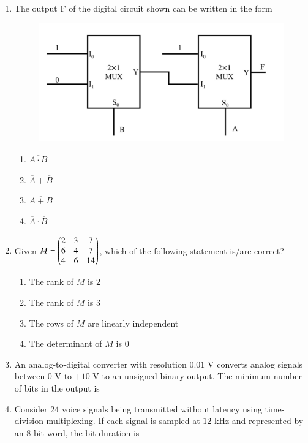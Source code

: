 \documentclass[journal,12pt,onecolumn]{IEEEtran}
\theoremstyle{remark}
\begin{document}
\begin{enumerate}
\item The output F of the digital circuit shown can be written in the form \underline{\hspace{2cm}}

\hfill{}
\begin{figure}[H]
\includegraphics[width = 0.7\columnwidth]{q23}
\caption*{}
\label{q23}
\end{figure}
\begin{enumerate}
\item $\overline{\overline{A \cdot B}}$
\item $\overline{A} + \overline{B}$
\item $\overline{A+B}$
\item $\overline{A} \cdot \overline{B}$
\end{enumerate}

\item Given $M = \begin{pmatrix} 2 & 3 & 7 \\ 6 & 4 & 7 \\ 4 & 6 & 14 \end{pmatrix}$, which of the following statement is/are correct?

\hfill{}
\begin{enumerate}
\item The rank of $M$ is $2$
\item The rank of $M$ is $3$
\item The rows of $M$ are linearly independent
\item The determinant of $M$ is $0$
\end{enumerate}

\item An analog-to-digital converter with resolution $0.01$ V converts analog signals between $0$ V to $+10$ V to an unsigned binary output. The minimum number of bits  in the output is \underline{\hspace{2cm}}

\hfill{}

\item Consider $24$ voice signals being transmitted without latency using time-division multiplexing. If each signal is sampled at $12$ kHz and represented by an $8$-bit word, the bit-duration  is \underline{\hspace{2cm}} 


\end{enumerate}
\end{document}
